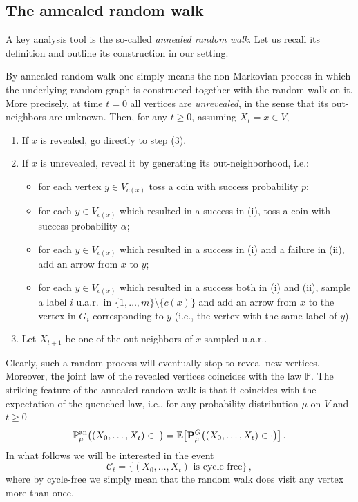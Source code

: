 \documentclass[11pt,oneside]{amsart}
\numberwithin{equation}{section}  %
\theoremstyle{plain}
\newcommand{\E}{\mathbb{E}}
\newcommand{\p}{\mathbb{P}}
\newcommand{\PP}{\mathbb{P}}
\newcommand{\quench}{\mathbf{P}}
\newcommand{\pan}{\p^{\textup{an}}}
\begin{document}
%
\subsection{The annealed random walk}\label{suse:annealed}
A key analysis tool is the so-called \emph{annealed random walk}. 
Let us recall its definition and outline its construction in our setting.

By annealed random walk one simply means the non-Markovian process in which the underlying random graph is constructed together with the random walk on it. 
More precisely, at time $t=0$ all vertices are \emph{unrevealed}, in the sense that its out-neighbors are unknown. Then, for any $t\ge0$, assuming $X_t=x\in V$,
\begin{enumerate}
\item If $x$ is revealed, go directly to step (3).
    \item If $x$ is unrevealed, reveal it by generating its out-neighborhood, i.e.:
    \begin{itemize}
    \item[(i)] for each vertex $y\in V_{c(x)}$ toss a coin with success probability $p$;
    \item[(ii)] for each $y\in V_{c(x)}$ which resulted in a success in (i), toss a coin with success probability $\alpha$;
    \item[(iii)] for each $y\in V_{c(x)}$ which resulted in a success in (i) and a failure in (ii), add an arrow from $x$ to $y$;
    \item[(iv)] for each $y\in V_{c(x)}$ which resulted in a success both in (i) and (ii), sample a label $i$ u.a.r.~in $\{1,\dots,m\}\setminus\{c(x)\}$ and add an arrow from $x$ to the vertex in $G_i$  corresponding to $y$ (i.e., the vertex with the same label of $y$).
  \end{itemize}
    \item Let $X_{t+1}$ be one of the out-neighbors of $x$ sampled u.a.r..
 \end{enumerate}
Clearly, such a random process will eventually stop to reveal new vertices. Moreover, the joint law of the revealed vertices coincides with the law $\PP$. The striking feature of the annealed random walk is that it coincides with the expectation of the quenched law, i.e., for any probability distribution $\mu$ on $V$ and $t\ge 0$
\begin{equation}
\pan_{\mu}\big((X_0,\dots,X_t)\in \cdot \big)=\E\big[\quench_\mu^G\big((X_0,\dots,X_t)\in\cdot\big)\big]\,.
\end{equation}
In what follows we will be interested in the event
\begin{equation}
\label{eq:C_t}
\mathcal{C}_t =\{(X_0,\dots,X_t) \text{ is cycle-free}\}\,,
\end{equation}
where by cycle-free we simply mean that the random walk does visit any vertex more than once. 
\end{document}
